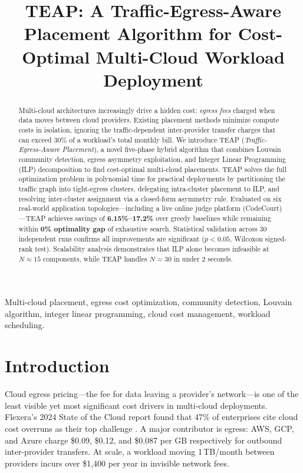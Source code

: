 \documentclass[10pt,journal,compsoc]{IEEEtran}
\title{TEAP: A Traffic-Egress-Aware Placement Algorithm for
       Cost-Optimal Multi-Cloud Workload Deployment}
\author{
  \IEEEauthorblockN{Author 1, Author 2, Author 3}
  \IEEEauthorblockA{
    Department of Computer Science and Engineering\\
    [Institution Name], [City, Country]\\
    \texttt{\{author1, author2, author3\}@institution.edu}
  }
}
\begin{document}
\maketitle

\begin{abstract}
Multi-cloud architectures increasingly drive a hidden cost: \emph{egress fees}
charged when data moves between cloud providers.
Existing placement methods minimize compute costs in isolation, ignoring the
traffic-dependent inter-provider transfer charges that can exceed 30\% of a
workload's total monthly bill.
We introduce TEAP (\emph{Traffic-Egress-Aware Placement}), a novel five-phase
hybrid algorithm that combines Louvain community detection, egress asymmetry
exploitation, and Integer Linear Programming (ILP) decomposition to find
cost-optimal multi-cloud placements.
TEAP solves the full optimization problem in polynomial time for practical
deployments by partitioning the traffic graph into tight-egress clusters,
delegating intra-cluster placement to ILP, and resolving inter-cluster
assignment via a closed-form asymmetry rule.
Evaluated on six real-world application topologies—including a live online
judge platform (CodeCourt)—TEAP achieves savings of \textbf{6.15\%–17.2\%}
over greedy baselines while remaining within \textbf{0\% optimality gap} of
exhaustive search.
Statistical validation across 30 independent runs confirms all improvements
are significant ($p < 0.05$, Wilcoxon signed-rank test).
Scalability analysis demonstrates that ILP alone becomes infeasible at
$N \approx 15$ components, while TEAP handles $N = 30$ in under 2 seconds.
\end{abstract}

\begin{IEEEkeywords}
Multi-cloud placement, egress cost optimization, community detection, Louvain
algorithm, integer linear programming, cloud cost management, workload
scheduling.
\end{IEEEkeywords}

\section{Introduction}

Cloud egress pricing—the fee for data leaving a provider's network—is one of
the least visible yet most significant cost drivers in multi-cloud deployments.
Flexera's 2024 State of the Cloud report found that 47\% of enterprises cite
cloud cost overruns as their top challenge \cite{flexera2024}.
A major contributor is egress: AWS, GCP, and Azure charge \$0.09, \$0.12,
and \$0.087 per GB respectively for outbound inter-provider transfers.
At scale, a workload moving 1\,TB/month between providers incurs over \$1,400
per year in invisible network fees.
\end{document}
